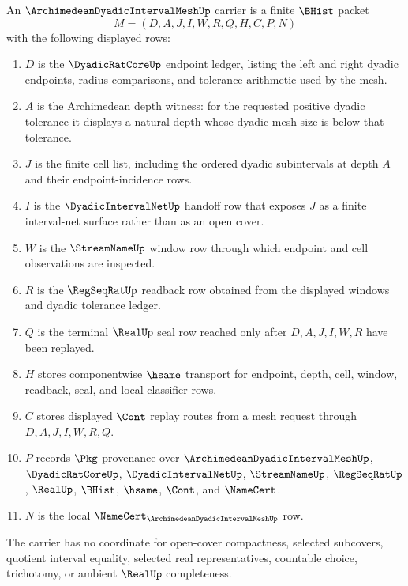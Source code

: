 \begin{definition}
\label{def:archimedean-dyadic-interval-mesh-carrier}
An $\ArchimedeanDyadicIntervalMeshUp$ carrier is a finite $\BHist$ packet
$$
M=(D,A,J,I,W,R,Q,H,C,P,N)
$$
with the following displayed rows:
\begin{enumerate}
\item $D$ is the $\DyadicRatCoreUp$ endpoint ledger, listing the left and right dyadic endpoints, radius comparisons, and tolerance arithmetic used by the mesh.
\item $A$ is the Archimedean depth witness: for the requested positive dyadic tolerance it displays a natural depth whose dyadic mesh size is below that tolerance.
\item $J$ is the finite cell list, including the ordered dyadic subintervals at depth $A$ and their endpoint-incidence rows.
\item $I$ is the $\DyadicIntervalNetUp$ handoff row that exposes $J$ as a finite interval-net surface rather than as an open cover.
\item $W$ is the $\StreamNameUp$ window row through which endpoint and cell observations are inspected.
\item $R$ is the $\RegSeqRatUp$ readback row obtained from the displayed windows and dyadic tolerance ledger.
\item $Q$ is the terminal $\RealUp$ seal row reached only after $D,A,J,I,W,R$ have been replayed.
\item $H$ stores componentwise $\hsame$ transport for endpoint, depth, cell, window, readback, seal, and local classifier rows.
\item $C$ stores displayed $\Cont$ replay routes from a mesh request through $D,A,J,I,W,R,Q$.
\item $P$ records $\Pkg$ provenance over $\ArchimedeanDyadicIntervalMeshUp$, $\DyadicRatCoreUp$, $\DyadicIntervalNetUp$, $\StreamNameUp$, $\RegSeqRatUp$, $\RealUp$, $\BHist$, $\hsame$, $\Cont$, and $\NameCert$.
\item $N$ is the local $\NameCert_{\ArchimedeanDyadicIntervalMeshUp}$ row.
\end{enumerate}
The carrier has no coordinate for open-cover compactness, selected subcovers, quotient interval equality, selected real representatives, countable choice, trichotomy, or ambient $\RealUp$ completeness.
\end{definition}

